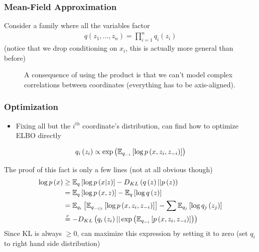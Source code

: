 \documentclass[10pt,mathserif]{beamer}
\begin{document}
\begin{frame}
  \frametitle{Mean-Field Approximation}
  Consider a family where all the variables factor
  \begin{align*}
    q\left(z_1, \dots, z_n\right) = \prod_{i = 1}^{n} q_{i}\left(z_i\right)
  \end{align*}
  (notice that we drop conditioning on $x_i$, this is actually more general than
  before)
\begin{figure}[ht]
  \centering
  \begin{subfigure}
    \texttt{[image: figure/variational\_multidimensional\_q]}
  \end{subfigure}
  \begin{subfigure}
    \texttt{[image: figure/variational\_product\_q]}
  \end{subfigure}
  \caption{A consequence of using the product is that we can't model complex correlations between coordinates (everything has to be axis-aligned).
    \label{fig:variational_product_q}}
\end{figure}
\end{frame}

\begin{frame}
  \frametitle{Optimization}
  \begin{itemize}
  \item Fixing all but the $i^{th}$ coordinate's distribution, can find how to
    optimize ELBO directly
  \end{itemize}
  \begin{align*}
q_i\left(z_i\right) \propto \operatorname{exp}\left(\mathbb{E}_{q_{-i}}\left[{\log p\left(x, z_i, z_{-i}\right)}\right]\right)
  \end{align*}
\end{frame}


\begin{frame}
  The proof of this fact is only a few lines (not at all obvious though)
  \begin{align*}
    \log p\left(x\right) &\geq
    \mathbb{E}_{q}\left[{\log p\left(x \vert z\right)}\right] - D_{KL}\left( q\left(z\right) \vert\vert p\left(z\right)\right) \\
    &= \mathbb{E}_{q}\left[{\log p\left(x, z\right)}\right] - \mathbb{E}_{q}\left[{\log q\left(z\right)}\right]\\
    &= \mathbb{E}_{q_i}\left[{\mathbb{E}_{q_{-i \vert i}}\left[{\log p\left(x, z_i, z_{-i}\right)}\right]}\right] - \sum \mathbb{E}_{q_j}\left[{\log q_j\left(z_j\right)}\right] \\
    &\stackrel{c}{=} -D_{KL}\left(q_{i}\left(z_i\right) \vert \vert \operatorname{exp}\left(\mathbb{E}_{q_{-i}}\left[{p\left(x, z_i, z_{-i}\right)}\right]\right)\right)
  \end{align*}
  Since KL is always $\geq 0$, can maximize this expression by setting it to zero
  (set $q_i$ to right hand side distribution)
\end{frame}
\end{document}
